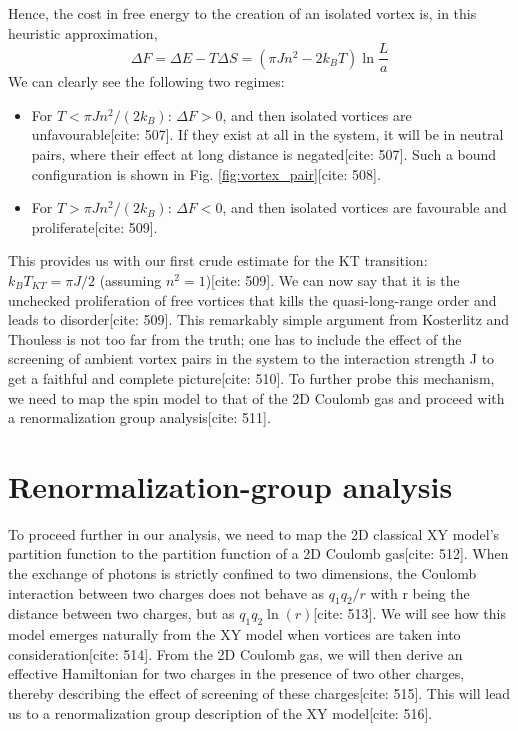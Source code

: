 \documentclass[11pt]{article}
\begin{document}
Hence, the cost in free energy to the creation of an isolated vortex is, in this heuristic approximation,
\begin{equation}
\Delta F = \Delta E - T \Delta S = (\pi J n^2 - 2 k_B T) \ln \frac{L}{a} \label{eq:vortex_F}
\end{equation}
We can clearly see the following two regimes:
\begin{itemize}
    \item For $T < \pi J n^2 / (2 k_B)$: $\Delta F > 0$, and then isolated vortices are unfavourable[cite: 507]. If they exist at all in the system, it will be in neutral pairs, where their effect at long distance is negated[cite: 507]. Such a bound configuration is shown in Fig. \ref{fig:vortex_pair}[cite: 508].
    \item For $T > \pi J n^2 / (2 k_B)$: $\Delta F < 0$, and then isolated vortices are favourable and proliferate[cite: 509].
\end{itemize}
This provides us with our first crude estimate for the KT transition: $k_B T_{KT} = \pi J / 2$ (assuming $n^2=1$)[cite: 509]. We can now say that it is the unchecked proliferation of free vortices that kills the quasi-long-range order and leads to disorder[cite: 509]. This remarkably simple argument from Kosterlitz and Thouless is not too far from the truth; one has to include the effect of the screening of ambient vortex pairs in the system to the interaction strength J to get a faithful and complete picture[cite: 510]. To further probe this mechanism, we need to map the spin model to that of the 2D Coulomb gas and proceed with a renormalization group analysis[cite: 511].

\section{Renormalization-group analysis}

To proceed further in our analysis, we need to map the 2D classical XY model's partition function to the partition function of a 2D Coulomb gas[cite: 512]. When the exchange of photons is strictly confined to two dimensions, the Coulomb interaction between two charges does not behave as $q_1 q_2 / r$ with r being the distance between two charges, but as $q_1 q_2 \ln(r)$[cite: 513]. We will see how this model emerges naturally from the XY model when vortices are taken into consideration[cite: 514]. From the 2D Coulomb gas, we will then derive an effective Hamiltonian for two charges in the presence of two other charges, thereby describing the effect of screening of these charges[cite: 515]. This will lead us to a renormalization group description of the XY model[cite: 516].
\end{document}
